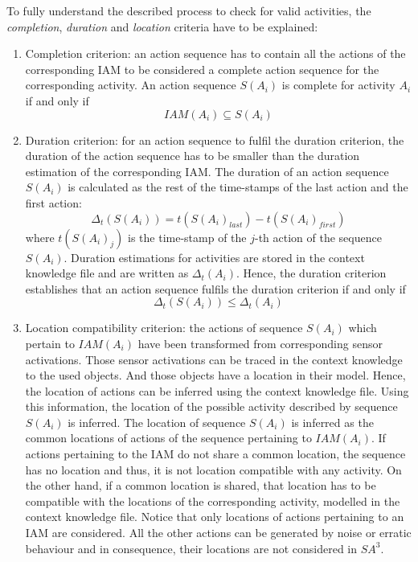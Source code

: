 To fully understand the described process to check for valid activities, the \textit{completion}, \textit{duration} and \textit{location} criteria have to be explained:

\begin{enumerate}
  \item Completion criterion: an action sequence has to contain all the actions of the corresponding IAM to be considered a complete action sequence for the corresponding activity. An action sequence $S(A_i)$ is complete for activity $A_i$ if and only if 
  \begin{equation}
  \label{eq-completion}
  IAM(A_i) \subseteq S(A_i)   
  \end{equation}
  
  \item Duration criterion: for an action sequence to fulfil the duration criterion, the duration of the action sequence has to be smaller than the duration estimation of the corresponding IAM. The duration of an action sequence $S(A_i)$ is calculated as the rest of the time-stamps of the last action and the first action: 
  \begin{equation}
    \Delta_t(S(A_i)) = t(S(A_i)_{last}) - t(S(A_i)_{first})
  \end{equation}
  where $t(S(A_i)_j)$ is the time-stamp of the $j$-th action of the sequence $S(A_i)$. Duration estimations for activities are stored in the context knowledge file and are written as $\Delta_t(A_i)$. Hence, the duration criterion establishes that an action sequence fulfils the duration criterion if and only if 
  \begin{equation}
   \label{eq-duration}
   \Delta_t(S(A_i)) \leq \Delta_t(A_i)
  \end{equation}  
  
  \item Location compatibility criterion: the actions of sequence $S(A_i)$ which pertain to $IAM(A_i)$ have been transformed from corresponding sensor activations. Those sensor activations can be traced in the context knowledge to the used objects. And those objects have a location in their model. Hence, the location of actions can be inferred using the context knowledge file. Using this information, the location of the possible activity described by sequence $S(A_i)$ is inferred. The location of sequence $S(A_i)$ is inferred as the common locations of actions of the sequence pertaining to $IAM(A_i)$. If actions pertaining to the IAM do not share a common location, the sequence has no location and thus, it is not location compatible with any activity. On the other hand, if a common location is shared, that location has to be compatible with the locations of the corresponding activity, modelled in the context knowledge file. Notice that only locations of actions pertaining to an IAM are considered. All the other actions can be generated by noise or erratic behaviour and in consequence, their locations are not considered in $SA^3$.
 \end{enumerate}

